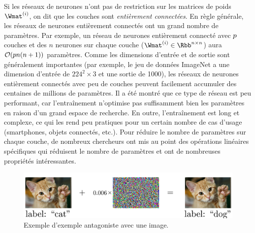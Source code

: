Si les réseaux de neurones n'ont pas de restriction sur les matrices de poids $\Wmat^{(i)}$, on dit que les couches sont \emph{entièrement connectées}.
En règle générale, les réseaux de neurones entièrement connectés ont un grand nombre de paramètres.
Par exemple, un réseau de neurones entièrement connecté avec $p$ couches et des $n$ neurones sur chaque couche ($\Wmat^{(i)} \in \Rbb^{n \times n}$) aura $\bigO\left(pn (n + 1)\right)$ paramètres.
Comme les dimensions d'entrée et de sortie sont généralement importantes (par exemple, le jeu de données ImageNet a une dimension d'entrée de $224^2 \times 3$ et une sortie de 1000), les réseaux de neurones entièrement connectés avec peu de couches peuvent facilement accumuler des centaines de millions de paramètres.
Il a été montré que ce type de réseau est peu performant, car l'entraînement n'optimise pas suffisamment bien les paramètres en raison d'un grand espace de recherche.
En outre, l'entraînement est long et complexe, ce qui les rend peu pratiques pour un certain nombre de cas d'usage (smartphones, objets connectés, etc.).
Pour réduire le nombre de paramètres sur chaque couche, de nombreux chercheurs ont mis au point des opérations linéaires spécifiques qui réduisent le nombre de paramètres et ont de nombreuses propriétés intéressantes.



\begin{figure}[t]
  \centering
  \includegraphics[width=\textwidth]{figures/main/ch1-introduction/ExampleAdversarialCatDog.pdf}
  \caption{Exemple d'exemple antagoniste avec une image.}
  \label{figure:ap7-adversarial_image_example}
\end{figure}


